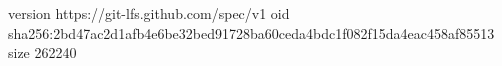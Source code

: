 version https://git-lfs.github.com/spec/v1
oid sha256:2bd47ac2d1afb4e6be32bed91728ba60ceda4bdc1f082f15da4eac458af85513
size 262240
